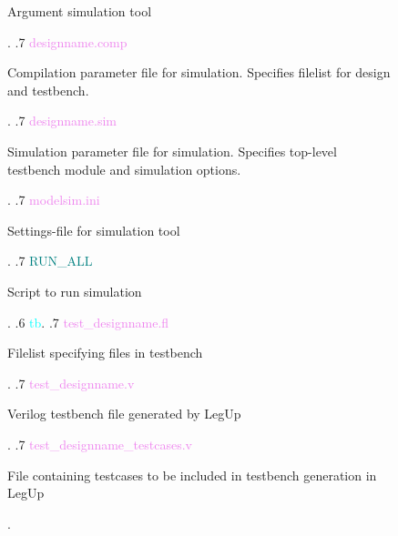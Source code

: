 \begin{figure}
\begin{minipage}{0.99\textwidth}
{\begin{minipage}[t]{6cm}
                                                            Argument simulation tool
                                                            \end{minipage}.
    .7 \textcolor{violet}{designname{.}comp} \dotfill \:\:\begin{minipage}[t]{6cm}
                                                            Compilation parameter file for simulation{.} Specifies filelist for design and testbench{.}
                                                            \end{minipage}.
    .7 \textcolor{violet}{designname{.}sim} \dotfill \:\:\begin{minipage}[t]{6cm}
                                                            Simulation parameter file for simulation{.} Specifies top-level testbench module and simulation options{.}
                                                            \end{minipage}.
    .7 \textcolor{violet}{modelsim{.}ini} \dotfill \:\:\begin{minipage}[t]{6cm}
                                                            Settings-file for simulation tool
                                                            \end{minipage}.
    .7 \textcolor{teal}{RUN\_ALL} \dotfill \:\:\begin{minipage}[t]{6cm}
                                                            Script to run simulation
                                                            \end{minipage}.
    .6 \textcolor{cyan}{tb}.
    .7 \textcolor{violet}{test\_designname{.}fl} \dotfill \:\:\begin{minipage}[t]{6cm}
                                                    Filelist specifying files in testbench
                                                    \end{minipage}.
    .7 \textcolor{violet}{test\_designname{.}v} \dotfill \:\:\begin{minipage}[t]{6cm}
                                                    Verilog testbench file generated by LegUp
                                                    \end{minipage}.
    .7 \textcolor{violet}{test\_designname\_testcases{.}v} \dotfill \:\:\begin{minipage}[t]{6cm}
                                                    File containing testcases to be included in testbench generation in LegUp
                                                    \end{minipage}.
}
\end{minipage}
\end{figure}
